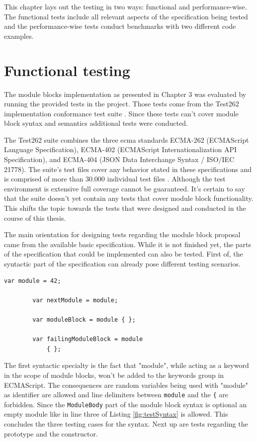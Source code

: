 This chapter lays out the testing in two ways: functional and performance-wise. The functional tests include all relevant aspects of the specification being tested and the performance-wise tests conduct benchmarks with two different code examples.

\section{Functional testing}

The module blocks implementation as presented in Chapter 3 was evaluated by running the provided tests in the project. Those tests come from the Test262 implementation conformance test suite \cite{ecmaTest262}. Since these tests can't cover module block syntax and semantics additional tests were conducted.

The Test262 suite combines the three ecma standards ECMA-262 (ECMAScript Language Specification), ECMA-402 (ECMAScript Internationalization API Specification), and ECMA-404 (JSON Data Interchange Syntax / ISO/IEC 21778). The suite's test files cover any  behavior stated in these specifications and is comprised of more than 30.000 individual test files \cite{ecmaTest262, ecmaTestSpec}. Although the test environment is extensive full coverage cannot be guaranteed. It's certain to say that the suite doesn't yet contain any tests that cover module block functionality. This shifts the topic towards the tests that were designed and conducted in the course of this thesis.

The main orientation for designing tests regarding the module block proposal came from the available basic specification. While it is not finished yet, the parts of the specification that could be implemented can also be tested. First of, the syntactic part of the specification can already pose different testing scenarios.

    \begin{lstlisting}[caption={Module block syntax tests}, label={fig:testSyntax}]
        var module = 42;
        
        var nextModule = module;
        
        var moduleBlock = module { };
        
        var failingModuleBlock = module
            { };
    \end{lstlisting}

The first syntactic specialty is the fact that "module", while acting as a keyword in the scope of module blocks, won't be added to the keywords group in ECMAScript. The consequences are random variables being used with "module" as identifier are allowed and line delimiters between \texttt{module} and the \texttt{\{} are forbidden. Since the \texttt{ModuleBody} part of the module block syntax  is optional an empty module like in line three of Listing \ref{fig:testSyntax} is allowed. This concludes the three testing cases for the syntax. Next up are tests regarding the prototype and the constructor.

